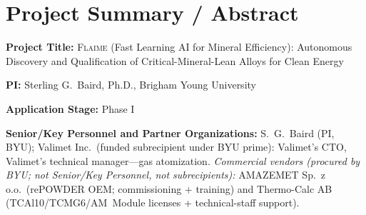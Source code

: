 \documentclass[11pt,letterpaper]{article}
\newif\ifsubmission
\newcommand{\guidance}[1]{\todo[inline,color=blue!20]{#1}}
\newcommand{\required}[1]{\todo[inline,color=red!25,bordercolor=red!60]{%
  \textbf{REQUIRED:} #1}}
\newcommand{\flaime}{\textsc{Flaime}}
\newcommand{\projecttitle}{\flaime{} (Fast Learning AI for Mineral
Efficiency): Autonomous Discovery and Qualification of
Critical-Mineral-Lean Alloys for Clean Energy}
\begin{document}
\ifsubmission\else  %
%
%
\section*{Project Summary / Abstract}
\label{sec:abstract}
\thispagestyle{empty}



\textbf{Project Title:} \projecttitle{}

\textbf{PI:} Sterling G.\ Baird, Ph.D., Brigham Young University

\textbf{Application Stage:} Phase I

\textbf{Senior/Key Personnel and Partner Organizations:}
S.\ G.\ Baird (PI, BYU);
Valimet Inc.\ (funded subrecipient under BYU prime): Valimet's CTO, Valimet's technical manager---gas atomization.
\textit{Commercial vendors (procured by BYU; not Senior/Key Personnel, not subrecipients):} AMAZEMET Sp.\ z o.o.\ (rePOWDER OEM; commissioning + training) and Thermo-Calc AB (TCAl10/TCMG6/AM~Module licenses + technical-staff support).

\bigskip
\end{document}
